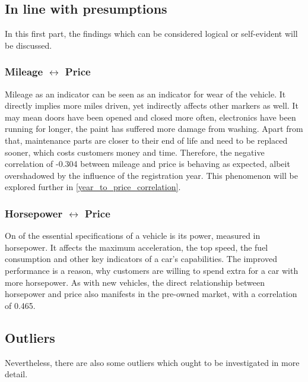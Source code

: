 \subsection{In line with presumptions}
In this first part, the findings which can be considered logical or self-evident will be discussed. 
\subsubsection{Mileage $\leftrightarrow$ Price}
Mileage as an indicator can be seen as an indicator for wear of the vehicle. It directly implies more miles driven,
yet indirectly affects other markers as well. It may mean doors have been opened and closed more often, 
electronics have been running for longer, the paint has suffered more damage from washing. 
Apart from that, maintenance parts are closer to their end of life and need to be replaced sooner,
which costs customers money and time. 
Therefore, the negative correlation of -0.304 between mileage and price is behaving as expected, albeit 
overshadowed by the influence of the registration year. This phenomenon will be explored further in \autoref{year_to_price_correlation}.
\subsubsection{Horsepower $\leftrightarrow$ Price}
On of the essential specifications of a vehicle is its power, measured in horsepower.
It affects the maximum acceleration, the top speed, the fuel consumption and other key indicators of a car's capabilities.
The improved performance is a reason, why customers are willing to spend extra for a car with more horsepower. 
As with new vehicles, the direct relationship between horsepower and price also manifests in the pre-owned market, %
with a correlation of 0.465.
\subsection{Outliers}
Nevertheless, there are also some outliers which ought to be investigated in more detail. 
